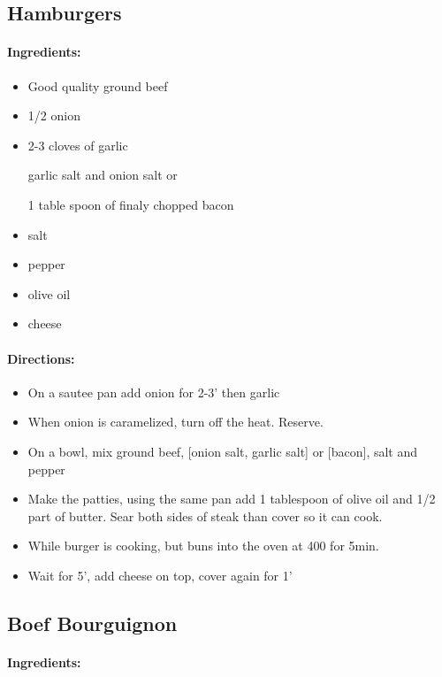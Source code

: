 \documentclass{article}
\begin{document}
\subsection{Hamburgers}

\paragraph{Ingredients:}

\begin{itemize}
	\item Good quality ground beef
	\item 1/2 onion
	\item 2-3 cloves of garlic
	\item [garlic salt and onion salt] or
	\item [1 table spoon of finaly chopped bacon]
	\item salt
	\item pepper
	\item olive oil
	\item cheese
\end{itemize}

\paragraph{Directions:}
\begin{itemize}
	\item On a sautee pan add onion for 2-3' then garlic
	\item When onion is caramelized, turn off the heat. Reserve.
	\item On a bowl, mix ground beef, [onion salt, garlic salt] or [bacon], salt and pepper
	\item Make the patties, using the same pan add 1 tablespoon of olive oil and 1/2 part of butter. Sear both sides of steak than cover so it can cook.
	\item While burger is cooking, but buns into the oven at 400 for 5min.
	\item Wait for 5', add cheese on top, cover again for 1'
\end{itemize} 

\subsection{Boef Bourguignon}

\paragraph{Ingredients:}
\end{document}
